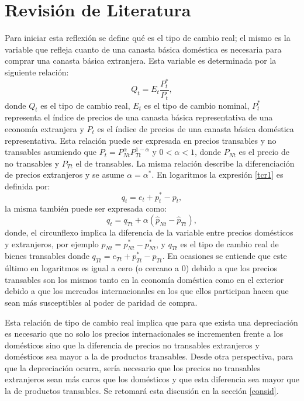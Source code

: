 \documentclass[12pt,letterpaper]{article}
\begin{document}
\section{Revisión de Literatura}\label{pre}


Para iniciar esta reflexión se define qué es el tipo de cambio real; el mismo es la variable que refleja cuanto de una canasta básica doméstica es necesaria para comprar una canasta básica extranjera. Esta variable es determinada por la siguiente relación:
\begin{equation}\label{tcr1}
Q_t=E_t\frac{P_t^*}{P_t},
\end{equation}
donde $Q_t$ es el tipo de cambio real, $E_t$ es el tipo de cambio nominal, $P_t^*$ representa el índice de precios de una canasta básica representativa de una economía extranjera y $P_t$ es el índice de precios de una canasta básica doméstica representativa. Esta relación puede ser expresada en precios transables y no transables asumiendo que $P_t=P_{Nt}^{\alpha} P_{Tt}^{1-\alpha}$ y $0<\alpha<1$, donde $P_{Nt}$ es el precio de no transables y $P_{Tt}$ el de transables. La misma relación describe la diferenciación de precios extranjeros y se asume $\alpha=\alpha^*$. En logaritmos la expresión \ref{tcr1} es definida por:
\begin{equation}\label{tcrlog}
q_t=e_t+p_t^*-p_t,
\end{equation}
la misma también puede ser expresada como:
\begin{equation}\label{tcr2}
q_t=q_{Tt}+\alpha(\hat{p}_{Nt}-\hat{p}_{Tt}),
\end{equation}
donde, el circunflexo implica la diferencia de la variable entre precios domésticos y extranjeros, por ejemplo $\hat{p}_{Nt}=p_{Nt}^*-p_{Nt}^*$, y $q_{Tt}$ es el tipo de cambio real de bienes transables donde $q_{Tt}=e_{Tt}+p_{Tt}^*-p_{Tt}$. En ocasiones se entiende que este último en logaritmos es igual a cero (o cercano a 0) debido a que los precios transables son los mismos tanto en la economía doméstica como en el exterior debido a que los mercados internacionales en los que ellos participan hacen que sean más susceptibles al poder de paridad de compra. 

Esta relación de tipo de cambio real implica que para que exista una depreciación es necesario que no solo los precios internacionales se incrementen frente a los domésticos sino que la diferencia de precios no transables extranjeros y domésticos sea mayor a la de productos transables. Desde otra perspectiva, para que la depreciación ocurra, sería necesario que los precios no transables extranjeros sean más caros que los domésticos y que esta diferencia sea mayor que la de productos transables. Se retomará esta discusión en la sección \ref{consid}.
\end{document}
